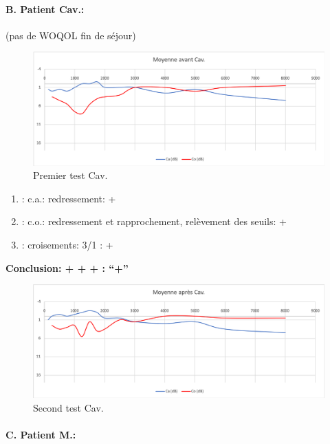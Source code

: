 \paragraph{B. Patient Cav.: }

(pas de WOQOL fin de séjour)


\begin{figure}
\centering
\includegraphics[width=0.7\linewidth]{images/graphiques/cav_pre.png}
\caption[Moyenne OG+OD]{Premier test Cav.}
       
\label{groupecontroleimage1}
\end{figure}

	\begin{enumerate}
 		
 		\item : c.a.: redressement: +
                
 		\item : c.o.: redressement et rapprochement, relèvement des seuils: +
 		\item : croisements: 3/1 :  +
                  
                \end{enumerate}

                \textbf{  Conclusion:  + + +       : ``+''}

                \begin{figure}
\centering
\includegraphics[width=0.7\linewidth]{images/graphiques/cav_post.png}
\caption[Moyenne OG+OD]{Second test Cav.}
       
\label{groupecontroleimage1}
                \end{figure}



                
               \paragraph{ C. Patient M.:}



